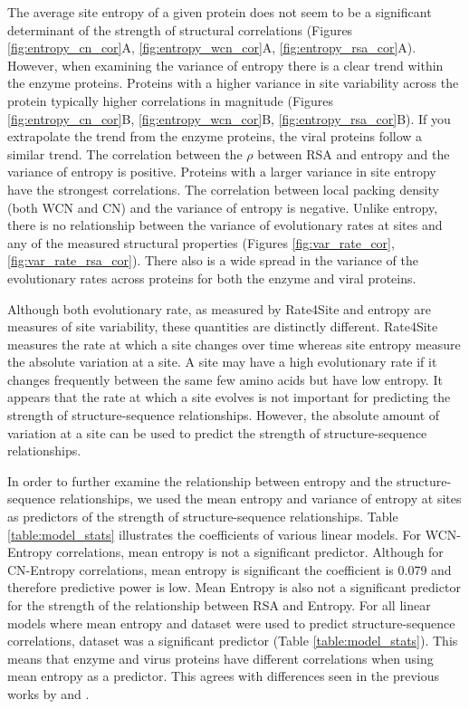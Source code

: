 \documentclass[12pt]{article}
\begin{document}
\indent  The average site entropy of a given protein does not seem to be a significant determinant of the strength of structural correlations (Figures \ref{fig:entropy_cn_cor}A, \ref{fig:entropy_wcn_cor}A, \ref{fig:entropy_rsa_cor}A). However, when examining the variance of entropy there is a clear trend within the enzyme proteins.  Proteins with a higher variance in site variability across the protein typically higher  correlations in magnitude (Figures \ref{fig:entropy_cn_cor}B, \ref{fig:entropy_wcn_cor}B, \ref{fig:entropy_rsa_cor}B). If you extrapolate the trend from the enzyme proteins, the viral proteins follow a similar trend. The correlation between the $\rho$ between RSA and entropy and the variance of entropy is positive. Proteins with a larger variance in site entropy have the strongest correlations. The correlation between local packing density (both WCN and CN) and the variance of entropy is negative. Unlike entropy, there is no relationship between the variance of evolutionary rates at sites and any of the measured structural properties (Figures \ref{fig:var_rate_cor}, \ref{fig:var_rate_rsa_cor}). There also is a wide spread in the variance of the evolutionary rates across proteins for both the enzyme and viral proteins. 

\indent Although both evolutionary rate, as measured by Rate4Site and entropy are measures of site variability, these quantities are distinctly different. Rate4Site measures the rate at which a site changes over time whereas site entropy measure the absolute variation at a site. A site may have a high evolutionary rate if it changes  frequently between the same few amino acids but have low entropy. It appears that the rate at which a site evolves is not important for predicting the strength of structure-sequence relationships. However, the absolute amount of variation at a site can be used to predict the strength of structure-sequence relationships. 

\indent In order to further examine the relationship between entropy and the structure-sequence relationships, we used the mean entropy and variance of entropy at sites as predictors of the strength of structure-sequence relationships. Table \ref{table:model_stats} illustrates the coefficients of various linear models. For WCN-Entropy correlations, mean entropy is not a significant predictor. Although for CN-Entropy correlations, mean entropy is significant the coefficient is 0.079 and therefore predictive power is low. Mean Entropy is also not a significant predictor for the strength of the relationship between RSA and Entropy. For all linear models where mean entropy and dataset were used to predict structure-sequence correlations, dataset was a significant predictor (Table \ref{table:model_stats}). This means that enzyme and virus proteins have different correlations when using mean entropy as a predictor. This agrees with differences seen in the previous works by \cite{Yehetal2014a} and \cite{Shahmoradietal2014}.  
\end{document}
